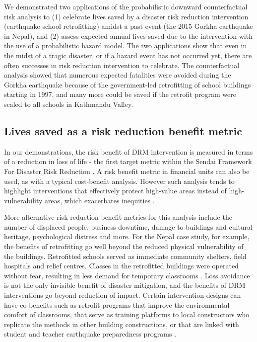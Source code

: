 \documentclass[utf8]{frontiersSCNS} %
\begin{document}
We demonstrated two applications of the probabilistic downward counterfactual risk analysis to (1) celebrate lives saved by a disaster risk reduction intervention (earthquake school retrofitting) amidst a past event (the 2015 Gorkha earthquake in Nepal), and (2) assess expected annual lives saved due to the intervention with the use of a probabilistic hazard model. The two applications show that even in the midst of a tragic disaster, or if a hazard event has not occurred yet, there are often successes in risk reduction intervention to celebrate. The counterfactual analysis showed that numerous expected fatalities were avoided during the Gorkha earthquake because of the government-led retrofitting of school buildings starting in 1997, and many more could be saved if the retrofit program were scaled to all schools in Kathmandu Valley. 

\vspace{0.5cm} %

\subsection{Lives saved as a risk reduction benefit metric}

In our demonstrations, the risk benefit of DRM intervention is measured in terms of a reduction in loss of life - the first target metric within the Sendai Framework For Disaster Risk Reduction \citep{united2015sendai}. A risk benefit metric in financial units can also be used, as with a typical cost-benefit analysis. However such analysis tends to highlight interventions that effectively protect high-value areas instead of high-vulnerability areas, which exacerbates inequities \citep{markhvida_quantification_2020, lallemant2020informatics}. 

More alternative risk reduction benefit metrics for this analysis include the number of displaced people, business downtime, damage to buildings and cultural heritage, psychological distress and more. For the Nepal case study, for example, the benefits of retrofitting go well beyond the reduced physical vulnerability of the buildings. Retrofitted schools served as immediate community shelters, field hospitals and relief centres. Classes in the retrofitted buildings were operated without fear, resulting in less demand for temporary classrooms \citep{marasini2020}. Loss avoidance is not the only invisible benefit of disaster mitigation, and the benefits of DRM interventions go beyond reduction of impact. Certain intervention designs can have co-benefits such as retrofit programs that improve the environmental comfort of classrooms, that serve as training platforms to local constructors who replicate the methods in other building constructions, or that are linked with student and teacher earthquake preparedness programs \citep{spence2021buildings}.
\end{document}
